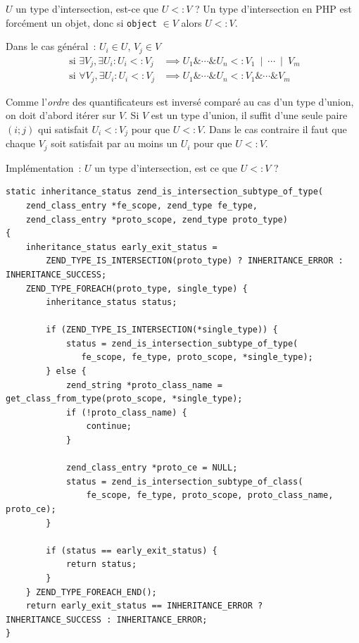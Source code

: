 \documentclass[10pt]{beamer}
\newcommand{\union}{\:\mathrel{|}\:}
\newcommand{\inter}{\mathrel{\&}}
\newcommand{\mif}{\text{ si }}
\newcommand{\subtype}{\mathrel{<:}}
\begin{document}
\begin{frame}{$U$ un type d'intersection, est-ce que $U \subtype V$ ?}
    Un type d'intersection en PHP est forcément un objet, donc si \texttt{object} $\in V$ alors $U \subtype V$.

    Dans le cas général~:
    $U_i \in U$, $V_j \in V$
    \begin{align}
        \mif\exists V_j, \exists U_i : U_i \subtype V_j & \implies U_1\inter\cdots\inter U_n \subtype V_1\union\cdots\union V_m \\
        \mif\forall V_j, \exists U_i : U_i \subtype V_j & \implies U_1\inter\cdots\inter U_n \subtype V_1\inter\cdots\inter V_m
    \end{align}

    Comme l'\emph{ordre} des quantificateurs est inversé comparé au cas d'un type d'union, on doit d'abord itérer sur $V$.
    Si $V$ est un type d'union, il suffit d'une seule paire $(i;j)$ qui satisfait  $U_i \subtype V_j$ pour que $U \subtype V$.
    Dans le cas contraire il faut que chaque $V_j$ soit satisfait par au moins un $U_i$ pour que $U \subtype V$.
\end{frame}
\begin{frame}[fragile]{Implémentation~: $U$ un type d'intersection, est ce que $U \subtype V$ ?}
    \begin{verbatim}
static inheritance_status zend_is_intersection_subtype_of_type(
    zend_class_entry *fe_scope, zend_type fe_type,
    zend_class_entry *proto_scope, zend_type proto_type)
{
    inheritance_status early_exit_status =
        ZEND_TYPE_IS_INTERSECTION(proto_type) ? INHERITANCE_ERROR : INHERITANCE_SUCCESS;
    ZEND_TYPE_FOREACH(proto_type, single_type) {
        inheritance_status status;

        if (ZEND_TYPE_IS_INTERSECTION(*single_type)) {
            status = zend_is_intersection_subtype_of_type(
               fe_scope, fe_type, proto_scope, *single_type);
        } else {
            zend_string *proto_class_name = get_class_from_type(proto_scope, *single_type);
            if (!proto_class_name) {
                continue;
            }

            zend_class_entry *proto_ce = NULL;
            status = zend_is_intersection_subtype_of_class(
                fe_scope, fe_type, proto_scope, proto_class_name, proto_ce);
        }

        if (status == early_exit_status) {
            return status;
        }
    } ZEND_TYPE_FOREACH_END();
    return early_exit_status == INHERITANCE_ERROR ? INHERITANCE_SUCCESS : INHERITANCE_ERROR;
}
    \end{verbatim}
\end{frame}
\end{document}
